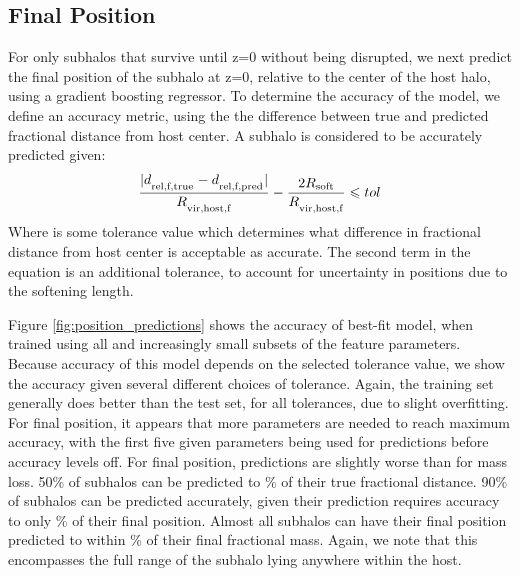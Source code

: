 \documentclass[fleqn,usenatbib]{mnras}
\begin{document}
\subsection{Final Position}
\label{sec:position}
For only subhalos that survive until z=0 without being disrupted, we next predict the final position of the subhalo at z=0, relative to the center of the host halo, using a gradient boosting regressor. To determine the accuracy of the model, we define an accuracy metric, using the the difference between true and predicted fractional distance from host center. A subhalo is considered to be accurately predicted given:
\begin{equation}
    \label{eq:position}
    \frac{|d_\textsubscript{rel,f,true} - d_\textsubscript{rel,f,pred}|}{R_\textsubscript{vir,host,f}} - \frac{2R\textsubscript{soft}}{R_\textsubscript{vir,host,f}} \leq tol
\end{equation}
Where  is some tolerance value which determines what difference in fractional distance from host center is acceptable as accurate. The second term in the equation is an additional tolerance, to account for uncertainty in positions due to the softening length.

Figure \ref{fig:position_predictions} shows the accuracy of best-fit model, when trained using all and increasingly small subsets of the feature parameters. Because accuracy of this model depends on the selected tolerance value, we show the accuracy given several different choices of tolerance. Again, the training set generally does better than the test set, for all tolerances, due to slight  overfitting. For final position, it appears that more parameters are needed to reach maximum accuracy, with the first five given parameters being used for predictions before accuracy levels off. For final position, predictions are slightly worse than for mass loss. 50\% of subhalos can be predicted to \% of their true fractional distance. 90\% of subhalos can be predicted accurately, given their prediction requires accuracy to only \% of their final position. Almost all subhalos can have their final position predicted to within \% of their final fractional mass. Again, we note that this encompasses the full range of the subhalo lying anywhere within the host.
\end{document}

